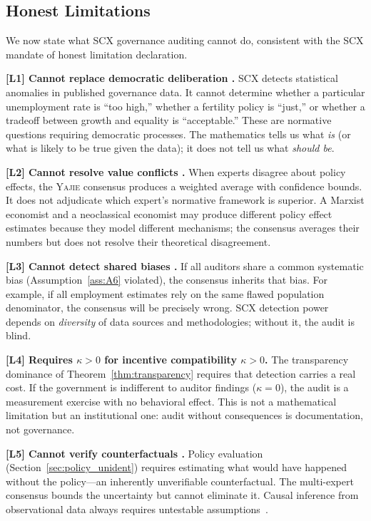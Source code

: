 \documentclass[11pt,a4paper]{article}
\theoremstyle{definition}
\newcommand{\Yajie}{\textsc{Yajie}}
\newcommand{\SCX}{\textsc{SCX}}
\newcommand{\limitationTag}[1]{\textsf{\textbf{[L#1]}}}
\begin{document}
\subsection{Honest Limitations}
We now state what \SCX{} governance auditing cannot do, consistent with the \SCX{} mandate of honest limitation declaration.
\begin{enumerate}[label=\limitationTag{\arabic*},leftmargin=*]
    \item \textbf{\limitationTag{1} Cannot replace democratic deliberation .} \SCX{} detects statistical anomalies in published governance data. It cannot determine whether a particular unemployment rate is ``too high,'' whether a fertility policy is ``just,'' or whether a tradeoff between growth and equality is ``acceptable.'' These are normative questions requiring democratic processes. The mathematics tells us what \textit{is} (or what is likely to be true given the data); it does not tell us what \textit{should be}.
    \item \textbf{\limitationTag{2} Cannot resolve value conflicts .} When experts disagree about policy effects, the \Yajie{} consensus produces a weighted average with confidence bounds. It does not adjudicate which expert's normative framework is superior. A Marxist economist and a neoclassical economist may produce different policy effect estimates because they model different mechanisms; the consensus averages their numbers but does not resolve their theoretical disagreement.
    \item \textbf{\limitationTag{3} Cannot detect shared biases .} If all auditors share a common systematic bias (Assumption~\ref{ass:A6} violated), the consensus inherits that bias. For example, if all employment estimates rely on the same flawed population denominator, the consensus will be precisely wrong. \SCX{} detection power depends on \textit{diversity} of data sources and methodologies; without it, the audit is blind.
    \item \textbf{\limitationTag{4} Requires $\kappa > 0$ for incentive compatibility $\kappa > 0$.} The transparency dominance of Theorem~\ref{thm:transparency} requires that detection carries a real cost. If the government is indifferent to auditor findings ($\kappa = 0$), the audit is a measurement exercise with no behavioral effect. This is not a mathematical limitation but an institutional one: audit without consequences is documentation, not governance.
    \item \textbf{\limitationTag{5} Cannot verify counterfactuals .} Policy evaluation (Section~\ref{sec:policy_unident}) requires estimating what would have happened without the policy---an inherently unverifiable counterfactual. The multi-expert consensus bounds the uncertainty but cannot eliminate it. Causal inference from observational data always requires untestable assumptions~\cite{Holland1986}.

\end{enumerate}
\end{document}

